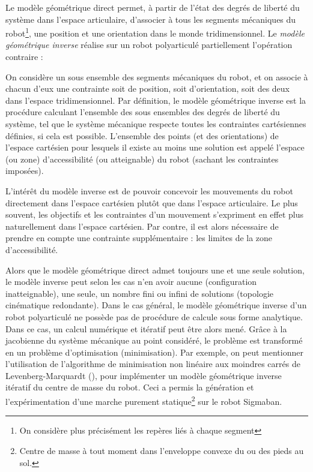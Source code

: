 Le modèle géométrique direct permet, à partir de l'état des degrés de liberté du
système dans l'espace articulaire, d'associer à tous les segments mécaniques
du robot\footnote{On considère plus précisément les repères liés à chaque segment}, 
une position et une orientation dans le monde tridimensionnel.
Le \textit{modèle géométrique inverse} réalise sur un robot polyarticulé 
\og partiellement \fg l'opération contraire :

\begin{definition}
    On considère un sous ensemble des segments mécaniques du robot, et on associe
    à chacun d'eux une contrainte soit de position, soit d'orientation, 
    soit des deux dans l'espace tridimensionnel.
    Par définition, le modèle géométrique inverse est la procédure calculant 
    l'ensemble des sous ensembles des degrés de liberté du système, tel que le
    système mécanique respecte toutes les contraintes cartésiennes définies,
    si cela est possible.
    L'ensemble des points (et des orientations) de l'espace cartésien
    pour lesquels il existe au moins une solution est appelé l'espace (ou zone) 
    d'accessibilité (ou atteignable) du robot (sachant les contraintes imposées).
\end{definition}

L'intérêt du modèle inverse est de pouvoir concevoir les mouvements du robot
directement dans l'espace cartésien plutôt que dans l'espace articulaire.
Le plus souvent, les objectifs et les contraintes d'un mouvement s'expriment 
en effet plus naturellement dans l'espace cartésien.
Par contre, il est alors nécessaire de prendre en compte une contrainte 
supplémentaire : les limites de la zone d'accessibilité.

Alors que le modèle géométrique direct admet toujours une et une seule
solution, le modèle inverse peut selon les cas n'en avoir aucune 
(configuration inatteignable), une seule, un nombre fini ou infini de solutions 
(topologie cinématique redondante).
Dans le cas général, le modèle géométrique inverse d'un robot polyarticulé 
ne possède pas de procédure de calcule sous forme analytique.
Dans ce cas, un calcul numérique et itératif peut être alors mené.
Grâce à la jacobienne du système mécanique au point considéré,
le problème est transformé en un problème d'optimisation (minimisation).
Par exemple, on peut mentionner l'utilisation de l'algorithme de minimisation
non linéaire aux moindres carrés de Levenberg-Marquardt (\cite{more_levenberg-marquardt_1978}), 
pour implémenter un modèle géométrique inverse itératif du centre de masse du robot.
Ceci a permis la génération et l'expérimentation d'une marche
purement statique\footnote{Centre de masse à tout moment dans l'enveloppe 
convexe du ou des pieds au sol.} sur le robot Sigmaban.

